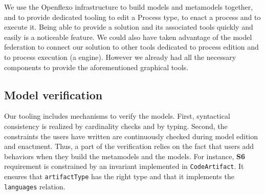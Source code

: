 
We use the Openflexo infrastructure to build models and metamodels together,
and to provide dedicated tooling to edit a Process type, to enact a process and
to execute it. Being able to provide a solution and its associated tools
quickly and easily is a noticeable feature.  We could also have taken advantage
of the model federation to connect our solution to other tools dedicated to
process edition and to process execution (\eg a \BPMN engine). However we
already had all the necessary components to provide the aforementioned
graphical tools.

\subsection{Model verification}


Our tooling includes mechanisms to verify the models. First, syntactical
consistency is realized by cardinality checks and by typing. Second, the
constraints the users have written are continuously checked during model
edition and enactment. Thus, a part of the verification relies on the fact that
users add behaviors when they build the metamodels and the models. For
instance, \textbf{S6} requirement is constrained by an invariant implemented in
\texttt{CodeArtifact}. It ensures that \texttt{artifactType} has the right type
and that it implements the \texttt{languages} relation.
